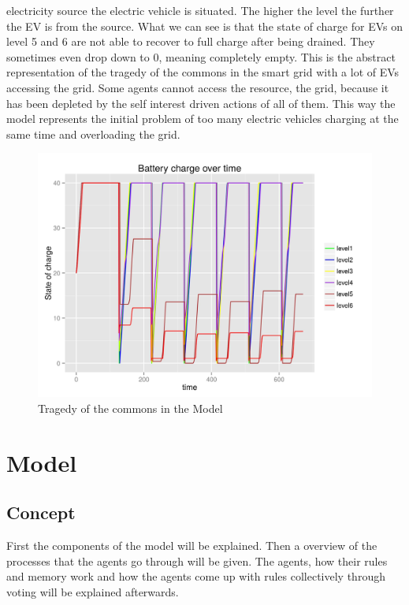 \documentclass[a4paper]{article}
\begin{document}
electricity source the electric vehicle is situated. The higher the level the further the EV is from the source. 
What we can see is that the state of charge for EVs on level 5 and 6 are not able to recover to full charge after being 
drained. They sometimes even drop down to 0, meaning completely empty. This is the abstract 
representation of the tragedy of the commons in the smart grid with a lot of EVs accessing the grid. Some agents 
cannot access the resource, the grid, because it has been depleted by the self interest driven actions of 
all of them. This way the model represents the initial problem of too many electric vehicles charging at the same time 
and overloading the grid. 


\begin{figure}[!ht]
 \centering
 \includegraphics[width = \textwidth]{tragedy_of_commons.jpg}
 \caption{Tragedy of the commons in the Model}
 \label{software_tragedy}
\end{figure}

\clearpage

\section{Model}
\subsection{Concept}
First the components of the model will be explained. Then a overview of the processes that the agents go through will be 
given. The agents, how their rules and memory work and how the agents come up with rules collectively through voting 
will be explained afterwards.
\end{document}
